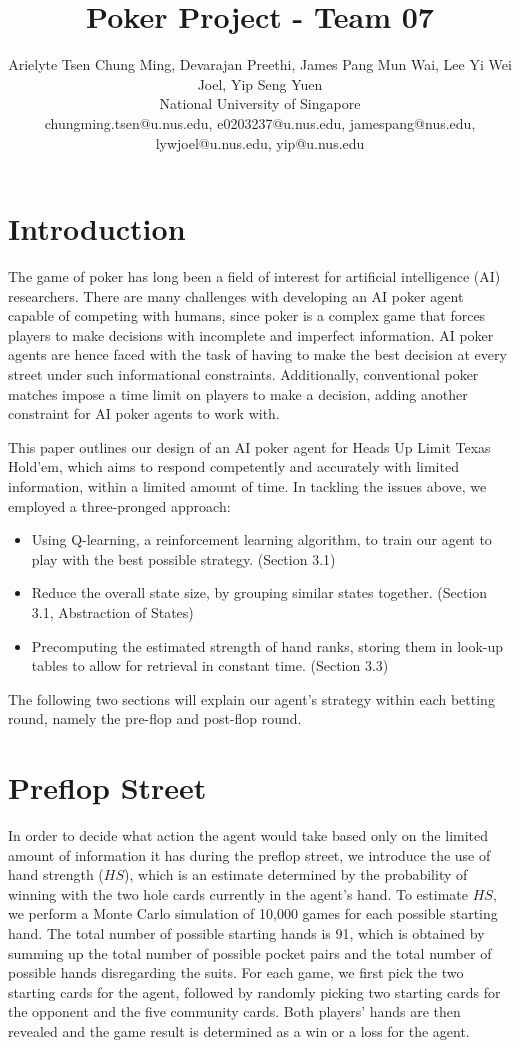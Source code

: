 \documentclass{article}
\title{Poker Project - Team 07}
\author{
Arielyte Tsen Chung Ming, Devarajan Preethi, James Pang Mun Wai, Lee Yi Wei Joel, Yip Seng Yuen
\\ 
National University of Singapore\\
%
chungming.tsen@u.nus.edu, e0203237@u.nus.edu, jamespang@nus.edu, lywjoel@u.nus.edu, yip@u.nus.edu
}
\begin{document}
\maketitle

\section{Introduction}

The game of poker has long been a field of interest for artificial intelligence (AI) researchers. There are many challenges with developing an AI poker agent capable of competing with humans, since poker is a complex game that forces players to make decisions with incomplete and imperfect information. AI poker agents are hence faced with the task of having to make the best decision at every street under such informational constraints. Additionally, conventional poker matches impose a time limit on players to make a decision, adding another constraint for AI poker agents to work with.

This paper outlines our design of an AI poker agent for Heads Up Limit Texas Hold’em, which aims to respond competently and accurately with limited information, within a limited amount of time. In tackling the issues above, we employed a three-pronged approach:

\begin{itemize}
  \item Using Q-learning, a reinforcement learning algorithm, to train our agent to play with the best possible strategy. (Section 3.1)
  \item Reduce the overall state size, by grouping similar states together. (Section 3.1, Abstraction of States)
  \item Precomputing the estimated strength of hand ranks, storing them in look-up tables to allow for retrieval in constant time. (Section 3.3)
 \end{itemize}

The following two sections will explain our agent’s strategy within each betting round, namely the pre-flop and post-flop round.
\section{Preflop Street}

In order to decide what action the agent would take based only on the limited amount of information it has during the preflop street, we introduce the use of hand strength ($HS$), which is an estimate determined by the probability of winning with the two hole cards currently in the agent’s hand.
To estimate $HS$, we perform a Monte Carlo simulation of 10,000 games for each possible starting hand. The total number of possible starting hands is 91, which is obtained by summing up the total number of possible pocket pairs and the total number of possible hands disregarding the suits. For each game, we first pick the two starting cards for the agent, followed by randomly picking two starting cards for the opponent and the five community cards. Both players’ hands are then revealed and the game result is determined as a win or a loss for the agent.
\end{document}
